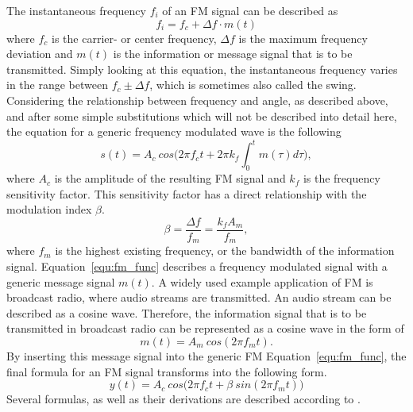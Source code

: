 \noindent
The instantaneous frequency $f_i$ of an FM signal can be described as
\begin{equation}
  f_i = f_c + \Delta f \cdot m(t)
\end{equation}
where $f_c$ is the carrier- or center frequency, $\Delta f$ is the maximum frequency deviation and $m(t)$ is the information or message signal that is to be transmitted.
Simply looking at this equation, the instantaneous frequency varies in the range between $f_c \pm \Delta f$, which is sometimes also called the swing.
Considering the relationship between frequency and angle, as described above, and after some simple substitutions which will not be described into detail here, the equation for a generic frequency modulated wave is the following
\begin{equation}
  s(t) = A_c\ cos \Big( 2 \pi f_c t + 2 \pi k_f \int_{0}^{t} m(\tau) d\tau \Big),
  \label{equ:fm_func}
\end{equation}
where $A_c$ is the amplitude of the resulting FM signal and $k_f$ is the frequency sensitivity factor.
This sensitivity factor has a direct relationship with the modulation index $\beta$.
\begin{equation}
  \beta = \frac{\Delta f}{f_m} = \frac{k_f A_m}{f_m},
\end{equation}
where $f_m$ is the highest existing frequency, or the bandwidth of the information signal.
Equation~\eqref{equ:fm_func} describes a frequency modulated signal with a generic message signal $m(t)$.
A widely used example application of FM is broadcast radio, where audio streams are transmitted.
An audio stream can be described as a cosine wave.
Therefore, the information signal that is to be transmitted in broadcast radio can be represented as a cosine wave in the form of
\begin{equation}
  m(t) = A_m\ cos(2 \pi f_m t).
\end{equation}
By inserting this message signal into the generic FM Equation~\eqref{equ:fm_func}, the final formula for an FM signal transforms into the following form.
\begin{equation}
  y(t) = A_c\ cos \Big(2 \pi f_c t + \beta\ sin(2 \pi f_m t)\Big )
\end{equation}
Several formulas, as well as their derivations are described according to \cite[pg.54-55]{MatinMohammadA2018CSfE}.

